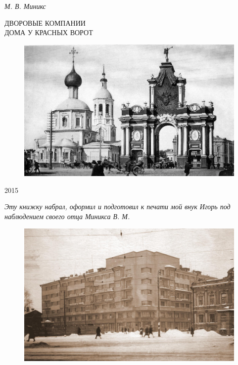 
\thispagestyle{empty} 

\begin{center}

\vspace{35pt}

\textit{ \Large{ М. В. Миникс}}

\vfill

\large ДВОРОВЫЕ КОМПАНИИ \\ ДОМА У КРАСНЫХ ВОРОТ

\vfill

\begin{figure}[ht]
  \centering
  \includegraphics[width=\textwidth]{inc/1/1}
\end{figure}

\vfill

2015

\end{center}

\newpage

\thispagestyle{empty} 



\vspace*{70pt}

\noindent
\begin{center}
\begin{minipage}{65mm}
\textit{Эту книжку набрал, оформил и подготовил к печати мой внук Игорь  под наблюдением своего отца Миникса В. М.}
\end{minipage}
\end{center}

\vspace{49pt}

\begin{figure}[h!]
  \centering
  \includegraphics[width=\textwidth]{inc/2/1}
\end{figure}

\newpage
